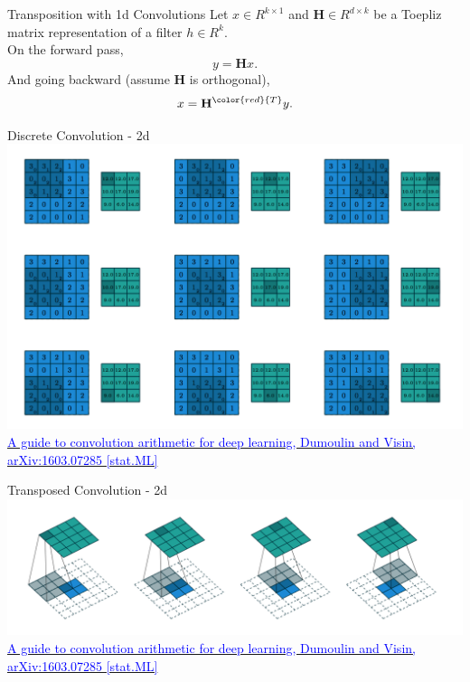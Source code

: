 \documentclass[]{beamer}
\begin{document}
\begin{frame}{Transposition with 1d Convolutions}
Let $x \in R^{k \times 1}$ and $\mathbf{H} \in R^{d \times k}$ be a Toepliz matrix representation of a filter $h \in R^{k}$. \\
\vspace{2mm}
\centering
On the forward pass,
\begin{equation*}
y = \mathbf{H} x.
\end{equation*}
And going backward (assume $\mathbf{H}$ is orthogonal),
\begin{equation*}
x = \mathbf{H}^{\color{red}{T}} y.
\end{equation*}
\end{frame}


\begin{frame}{Discrete Convolution - 2d}
\centering
\includegraphics[scale=0.325]{figures/discrete-convolution} \\
\href{https://arxiv.org/abs/1511.07122}
{\textcolor{blue}{A guide to convolution arithmetic for deep learning, Dumoulin and Visin, arXiv:1603.07285 [stat.ML]}}
\end{frame}


\begin{frame}{Transposed Convolution - 2d}
\centering
\includegraphics[scale=0.325]{figures/transposed-convolution} \\
\href{https://arxiv.org/abs/1511.07122}
{\textcolor{blue}{A guide to convolution arithmetic for deep learning, Dumoulin and Visin, arXiv:1603.07285 [stat.ML]}}
\end{frame}
\end{document}
